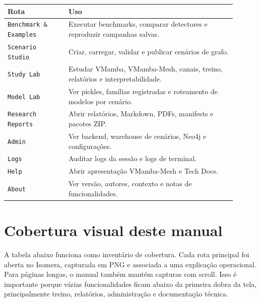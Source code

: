 \documentclass[12pt,oneside]{book}
\newcommand{\route}[1]{\texttt{#1}}
\begin{document}
\begin{longtable}{p{0.24\linewidth}p{0.66\linewidth}}
\textbf{Rota} & \textbf{Uso} \\
\hline
\route{Benchmark \& Examples} & Executar benchmarks, comparar detectores e reproduzir campanhas salvas. \\
\route{Scenario Studio} & Criar, carregar, validar e publicar cenários de grafo. \\
\route{Study Lab} & Estudar VMamba, VMamba-Mesh, canais, treino, relatórios e interpretabilidade. \\
\route{Model Lab} & Ver pickles, famílias registradas e roteamento de modelos por cenário. \\
\route{Research Reports} & Abrir relatórios, Markdown, PDFs, manifests e pacotes ZIP. \\
\route{Admin} & Ver backend, warehouse de cenários, Neo4j e configurações. \\
\route{Logs} & Auditar logs da sessão e logs de terminal. \\
\route{Help} & Abrir apresentação VMamba-Mesh e Tech Docs. \\
\route{About} & Ver versão, autores, contexto e notas de funcionalidades. \\
\end{longtable}

\section{Cobertura visual deste manual}

A tabela abaixo funciona como inventário de cobertura. Cada rota principal foi aberta no Isomera, capturada em PNG e associada a uma explicação operacional. Para páginas longas, o manual também mantém capturas com scroll. Isso é importante porque várias funcionalidades ficam abaixo da primeira dobra da tela, principalmente treino, relatórios, administração e documentação técnica.
\end{document}
